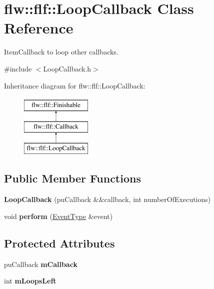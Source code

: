 \hypertarget{classflw_1_1flf_1_1LoopCallback}{}\section{flw\+:\+:flf\+:\+:Loop\+Callback Class Reference}
\label{classflw_1_1flf_1_1LoopCallback}


Item\+Callback to loop other callbacks.  




{\ttfamily \#include $<$Loop\+Callback.\+h$>$}

Inheritance diagram for flw\+:\+:flf\+:\+:Loop\+Callback\+:\begin{figure}[H]
\begin{center}
\leavevmode
\includegraphics[height=3.000000cm]{classflw_1_1flf_1_1LoopCallback}
\end{center}
\end{figure}
\subsection*{Public Member Functions}
\begin{DoxyCompactItemize}
\item 
{\bfseries Loop\+Callback} (pu\+Callback \&\&callback, int number\+Of\+Executions)\hypertarget{classflw_1_1flf_1_1LoopCallback_ae45977f11d553f490f0e022bf7c22653}{}\label{classflw_1_1flf_1_1LoopCallback_ae45977f11d553f490f0e022bf7c22653}

\item 
void {\bfseries perform} (\hyperlink{classflw_1_1flf_1_1EventType}{Event\+Type} \&event)\hypertarget{classflw_1_1flf_1_1LoopCallback_a8f8799c89d22c9768a25b1a609c53f63}{}\label{classflw_1_1flf_1_1LoopCallback_a8f8799c89d22c9768a25b1a609c53f63}

\end{DoxyCompactItemize}
\subsection*{Protected Attributes}
\begin{DoxyCompactItemize}
\item 
pu\+Callback {\bfseries m\+Callback}\hypertarget{classflw_1_1flf_1_1LoopCallback_a4f29f7de3fd74af7f247414f83e0cf9e}{}\label{classflw_1_1flf_1_1LoopCallback_a4f29f7de3fd74af7f247414f83e0cf9e}

\item 
int {\bfseries m\+Loops\+Left}\hypertarget{classflw_1_1flf_1_1LoopCallback_aa44a5b91b978ee67de5a6e251c3cefac}{}\label{classflw_1_1flf_1_1LoopCallback_aa44a5b91b978ee67de5a6e251c3cefac}

\end{DoxyCompactItemize}

